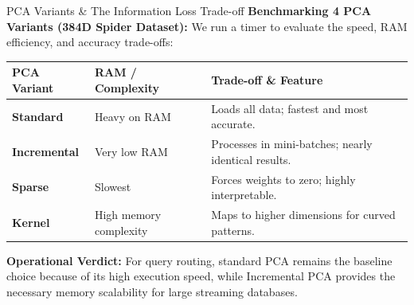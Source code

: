 \documentclass[9pt]{beamer}
\begin{document}
%
%

\begin{frame}{PCA Variants \& The Information Loss Trade-off}
    \textbf{Benchmarking 4 PCA Variants (384D Spider Dataset):}
    We run a timer to evaluate the speed, RAM efficiency, and accuracy trade-offs:

    \vspace{0.2cm}
    \begin{table}
        \centering
        \scriptsize
        \begin{tabular}{lp{2.4cm}p{3.8cm}}
            \hline
            \textbf{PCA Variant} & \textbf{RAM / Complexity} & \textbf{Trade-off \& Feature} \\ \hline
            \textbf{Standard} & Heavy on RAM & Loads all data; fastest and most accurate. \\
            \textbf{Incremental} & Very low RAM & Processes in mini-batches; nearly identical results. \\
            \textbf{Sparse} & Slowest & Forces weights to zero; highly interpretable. \\
            \textbf{Kernel} & High memory complexity & Maps to higher dimensions for curved patterns. \\ \hline
        \end{tabular}
    \end{table}

    \vspace{0.6cm}
    \textbf{Operational Verdict:}
    For query routing, standard PCA remains the baseline choice because of its high execution speed, while Incremental PCA provides the necessary memory scalability for large streaming databases.
\end{frame}
\end{document}
